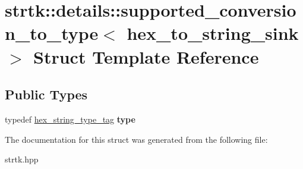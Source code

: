 \hypertarget{structstrtk_1_1details_1_1supported__conversion__to__type_3_01hex__to__string__sink_01_4}{\section{strtk\-:\-:details\-:\-:supported\-\_\-conversion\-\_\-to\-\_\-type$<$ hex\-\_\-to\-\_\-string\-\_\-sink $>$ Struct Template Reference}
\label{structstrtk_1_1details_1_1supported__conversion__to__type_3_01hex__to__string__sink_01_4}
}
\subsection*{Public Types}
\begin{DoxyCompactItemize}
\item 
\hypertarget{structstrtk_1_1details_1_1supported__conversion__to__type_3_01hex__to__string__sink_01_4_ab549a9a6546ca416cdc381bcf9910c79}{typedef \hyperlink{structstrtk_1_1details_1_1hex__string__type__tag}{hex\-\_\-string\-\_\-type\-\_\-tag} {\bfseries type}}\label{structstrtk_1_1details_1_1supported__conversion__to__type_3_01hex__to__string__sink_01_4_ab549a9a6546ca416cdc381bcf9910c79}

\end{DoxyCompactItemize}


The documentation for this struct was generated from the following file\-:\begin{DoxyCompactItemize}
\item 
strtk.\-hpp\end{DoxyCompactItemize}
